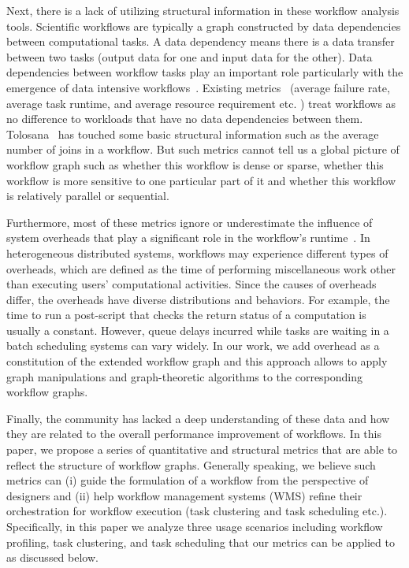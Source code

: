 Next, there is a lack of utilizing structural information in these workflow analysis tools. Scientific workflows are typically a graph constructed by data dependencies between computational tasks.  A data dependency means there is a data transfer between two tasks (output data for one and input data for the other). Data dependencies between workﬂow tasks play an important role particularly with the emergence of data intensive workflows~\cite{Callaghan2011}. Existing metrics~\cite{Juve2013, Callaghan2011, Bharathi2008}  (average failure rate, average task runtime, and average resource requirement etc. ) treat workflows as no difference to workloads that have no data dependencies between them. Tolosana~\cite{Tolosana2011} has touched some basic structural information such as the average number of joins in a workflow. But such metrics cannot tell us a global picture of workflow graph such as whether this workflow is dense or sparse, whether this workflow is more sensitive to one particular part of it and whether this workflow is relatively parallel or sequential. 

Furthermore, most of these metrics ignore or underestimate the influence of system overheads that play a significant role in the workflow's runtime~\cite{Chen2011, Prodan2008, Ostberg2011}. In heterogeneous distributed systems, workflows may experience different types of overheads, which are defined as the time of performing miscellaneous work other than executing users’ computational activities. Since the causes of overheads differ, the overheads have diverse distributions and behaviors. For example, the time to run a post-script that checks the return status of a computation is usually a constant. However, queue delays incurred while tasks are waiting in a batch scheduling systems can vary widely. In our work, we add overhead as a constitution of the extended workflow graph and this approach allows to apply graph manipulations and graph-theoretic algorithms to the corresponding workflow graphs. 

Finally, the community has lacked a deep understanding of these data and how they are related to the overall performance improvement of workflows. In this paper, we propose a series of quantitative and structural metrics that are able to reflect the structure of workflow graphs. Generally speaking, we believe such metrics can (i) guide the formulation of a workflow from the perspective of designers and (ii) help workflow management systems (WMS) refine their orchestration for workflow execution (task clustering and task scheduling etc.). Specifically, in this paper we analyze three usage scenarios including workflow profiling, task clustering, and task scheduling that our metrics can be applied to as discussed below. 

